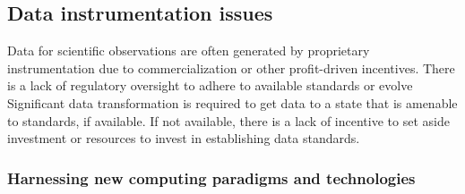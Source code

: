 \documentclass[
  letterpaper,
  DIV=11,
  numbers=noendperiod]{scrartcl}
\begin{document}
\subsection{Data instrumentation
issues}\label{data-instrumentation-issues}

Data for scientific observations are often generated by proprietary
instrumentation due to commercialization or other profit-driven
incentives. There is a lack of regulatory oversight to adhere to
available standards or evolve Significant data transformation is
required to get data to a state that is amenable to standards, if
available. If not available, there is a lack of incentive to set aside
investment or resources to invest in establishing data standards.

\subsubsection{Harnessing new computing paradigms and
technologies}\label{harnessing-new-computing-paradigms-and-technologies}
\end{document}
